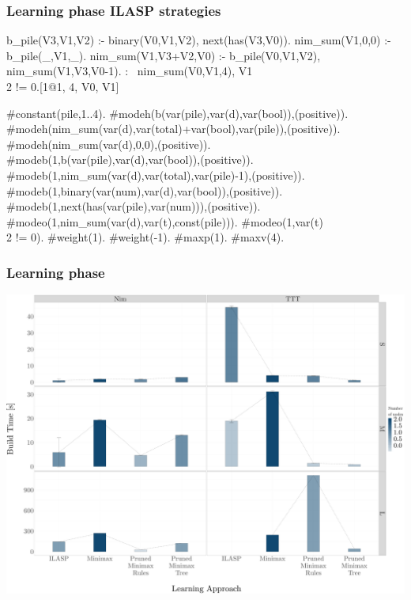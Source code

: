 \documentclass{beamer}
\begin{document}
  \begin{frame}[fragile]
    \footnotesize
    \frametitle{Learning phase ILASP strategies}

\begin{example}
  \begin{semiverbatim}
b_pile(V3,V1,V2) :- binary(V0,V1,V2), next(has(V3,V0)).
nim\_sum(V1,0,0) :- b_pile(\_,V1,\_).
nim\_sum(V1,V3+V2,V0) :- b_pile(V0,V1,V2), nim\_sum(V1,V3,V0-1).
:~ nim\_sum(V0,V1,4), V1\\2 != 0.[1@1, 4, V0, V1]
\end{semiverbatim}
\end{example}
\pause

  \begin{example}
    \begin{semiverbatim}
#constant(pile,1..4). 
#modeh(b(var(pile),var(d),var(bool)),(positive)).
#modeh(nim\_sum(var(d),var(total)+var(bool),var(pile)),(positive)).
#modeh(nim_sum(var(d),0,0),(positive)).
#modeb(1,b(var(pile),var(d),var(bool)),(positive)).
#modeb(1,nim\_sum(var(d),var(total),var(pile)-1),(positive)).
#modeb(1,binary(var(num),var(d),var(bool)),(positive)).
#modeb(1,next(has(var(pile),var(num))),(positive)).
#modeo(1,nim\_sum(var(d),var(t),const(pile))).
#modeo(1,var(t)\\2 != 0).
#weight(1). #weight(-1). #maxp(1). #maxv(4).
  \end{semiverbatim}
  \end{example}
  


\end{frame}


\begin{framefont}{\footnotesize}
  \begin{frame}
    \frametitle{Learning phase}
    \includegraphics[width=\textwidth,height=0.9\textheight,keepaspectratio]{bar_build.pdf}
  \end{frame}
\end{framefont}
\end{document}
